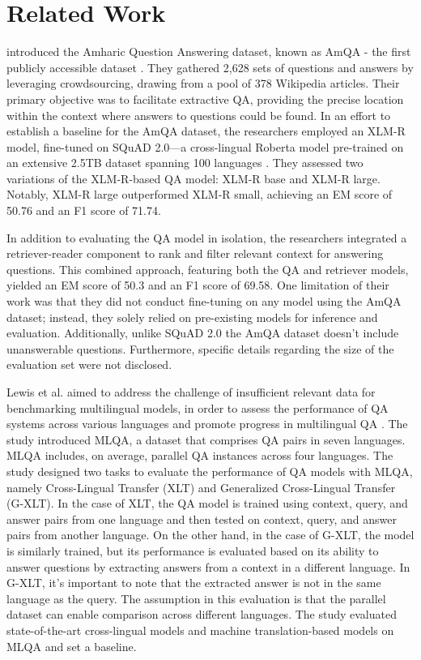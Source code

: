 \section{Related Work}

\cite{abedissa2023amqa} introduced the Amharic Question Answering dataset, known as AmQA - the first publicly accessible dataset \cite{abedissa2023amqa}. They gathered 2,628 sets of questions and answers by leveraging crowdsourcing, drawing from a pool of 378 Wikipedia articles. Their primary objective was to facilitate extractive QA, providing the precise location within the context where answers to questions could be found. In an effort to establish a baseline for the AmQA dataset, the researchers employed an XLM-R model, fine-tuned on SQuAD 2.0—a cross-lingual Roberta model pre-trained on an extensive 2.5TB dataset spanning 100 languages \cite{conneau2019unsupervised}. They assessed two variations of the XLM-R-based QA model: XLM-R base and XLM-R large. Notably, XLM-R large outperformed XLM-R small, achieving an EM score of 50.76 and an F1 score of 71.74. 

In addition to evaluating the QA model in isolation, the researchers integrated a retriever-reader component to rank and filter relevant context for answering questions. This combined approach, featuring both the QA and retriever models, yielded an EM score of 50.3 and an F1 score of 69.58. One limitation of their work was that they did not conduct fine-tuning on any model using the AmQA dataset; instead, they solely relied on pre-existing models for inference and evaluation. Additionally, unlike SQuAD 2.0 the AmQA dataset doesn’t include unanswerable questions. Furthermore, specific details regarding the size of the evaluation set were not disclosed.

Lewis et al. aimed to address the challenge of insufficient relevant data for benchmarking multilingual models, in order to assess the performance of QA systems across various languages and promote progress in multilingual QA \cite{lewis2019mlqa}. The study introduced MLQA, a dataset that comprises QA pairs in seven languages. MLQA includes, on average, parallel QA instances across four languages. The study designed two tasks to evaluate the performance of QA models with MLQA, namely Cross-Lingual Transfer (XLT) and Generalized Cross-Lingual Transfer (G-XLT). In the case of XLT, the QA model is trained using context, query, and answer pairs from one language and then tested on context, query, and answer pairs from another language. On the other hand, in the case of G-XLT, the model is similarly trained, but its performance is evaluated based on its ability to answer questions by extracting answers from a context in a different language. In G-XLT, it's important to note that the extracted answer is not in the same language as the query. The assumption in this evaluation is that the parallel dataset can enable comparison across different languages. The study evaluated state-of-the-art cross-lingual models and machine translation-based models on MLQA and set a baseline. 

